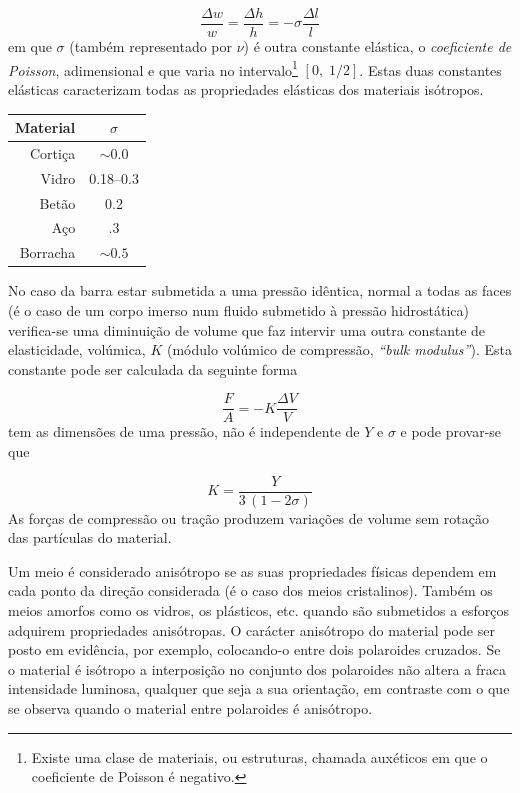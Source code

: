 \documentclass[a4paper,12pt]{article}
\begin{document}
\begin{equation}
	\label{eq:poisson}
	 \frac{\Delta w}{w}  =   \frac{\Delta h}{h}  = - \sigma  \frac{\Delta l}{l} 
\end{equation}
em que $\sigma$ (também representado por $\nu$) é outra constante elástica, o \emph{coeficiente de Poisson}, adimensional e que varia no intervalo\footnote{Existe uma clase de materiais, ou estruturas, chamada auxéticos em que o coeficiente de Poisson é negativo.} $[ 0,\;1/2 ] $.
Estas duas constantes elásticas caracterizam todas as propriedades elásticas dos materiais isótropos.

\begin{center}

\begin{tabular}{|r|c|}
\hline
\textbf{Material} & \textbf{$\sigma$}\\
\hline
Cortiça  & $\sim 0.0$ \\
Vidro & 0.18–0.3 \\
Betão & 0.2\\
Aço  & .3 \\
Borracha & $\sim 0.5$\\
\hline
\end{tabular}
\end{center}


No caso da barra estar submetida a uma pressão idêntica, normal a todas as faces (é o caso de um corpo imerso num fluido submetido à pressão hidrostática) verifica-se uma diminuição de volume que faz intervir uma outra constante de elasticidade, volúmica, $K$ (módulo volúmico de compressão, \emph{“bulk modulus”}). Esta constante pode ser calculada da seguinte forma

\begin{equation}
	\label{eq:bulk}
	 \frac{F}{A}  =  -K \frac{\Delta V}{V} 
\end{equation}
tem as dimensões de uma pressão, não é independente de $Y$ e $\sigma$ e pode provar-se que 

\begin{equation}
	\label{eq:K}
	 K=\frac{Y}{3\,(1-2\sigma)} 
\end{equation}
As forças de compressão ou tração produzem variações de volume sem rotação das partículas do material.

Um meio é considerado anisótropo se as suas propriedades físicas dependem em cada ponto da direção considerada (é o caso dos meios cristalinos). Também os meios amorfos como os vidros, os plásticos, etc. quando são submetidos a esforços adquirem propriedades anisótropas. O carácter anisótropo do material pode ser posto em evidência, por exemplo, colocando-o entre dois polaroides cruzados. Se o material é isótropo a interposição no conjunto dos polaroides não altera a fraca intensidade luminosa, qualquer que seja a sua orientação, em contraste com o que se observa quando o material entre polaroides é anisótropo.
\end{document}
